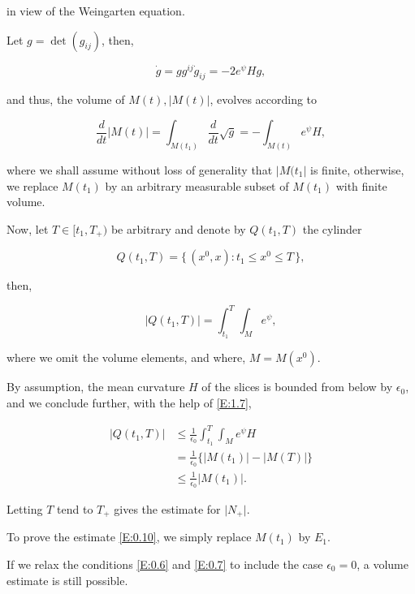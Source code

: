 \documentclass[ a4paper, oneside]{amsart}
\newcommand{\e}{\epsilon}
\newcommand{\set}[2]{\{\,#1\colon #2\,\}}
\newcommand{\abs}[1]{\lvert#1\rvert}
\newcommand\nd{\noindent}
\newcommand\cvm{\vspace\Cmedskipamount}
\newcommand\cvb{\vspace\Cbigskipamount}
\newcommand{\lae}[1]{\label{E:#1}}
\newcommand{\re}[1]{\eqref{E:#1}}
\theoremstyle{plain}
\theoremstyle{definition}
\theoremstyle{remark}
\numberwithin{equation}{section}
\begin{document}
\cvm
\nd in view of the Weingarten equation.

\cvm
Let $g=\det(g_{ij})$, then,

\begin{equation}\lae{1.6}
\dot g= g g^{ij}\dot g_{ij}=-2e^\psi H g,
\end{equation}

\cvm
\nd and thus, the volume of $M(t), \abs{M(t)}$, evolves according to

\begin{equation}\lae{1.7}
\frac d{dt}  \abs{M(t)}=\int_{M(t_1)}\frac d{dt}\sqrt g=-\int_{M(t)}e^\psi H,
\end{equation}

\cvm
\nd where we shall assume without loss of generality that $\abs{M(t_1}$ is finite,
otherwise, we replace $M(t_1)$ by an arbitrary measurable subset of $M(t_1)$
with finite volume.

\cvm
Now, let $T\in [t_1, T_+)$ be arbitrary and denote by $Q(t_1,T)$ the
cylinder

\begin{equation}\lae{1.8}
Q(t_1,T)=\set{(x^0,x)}{t_1\le x^0\le T},
\end{equation}

\cvm
\nd then,

\begin{equation}\lae{1.9}
\abs{Q(t_1,T)}=\int_{t_1}^T\int_Me^\psi,
\end{equation}

\cvm
\nd where we omit the volume elements, and where, $M=M(x^0)$.

\cvm
By assumption, the mean curvature $H$ of the slices is bounded from below by
$\e_0$, and we conclude further, with the help of \re{1.7},

\begin{equation}
\begin{aligned}
\abs{Q(t_1,T)}&\le\frac 1{\e_0} \int_{t_1}^T\int_Me^\psi H\\
&=\frac1{\e_0}\{\abs{M(t_1)}-\abs{M(T)}\}\\
&\le \frac1{\e_0}\abs{M(t_1)}.
\end{aligned}
\end{equation}


\cvm
Letting $T$ tend to $T_+$ gives the estimate for $\abs {N_+}$.

\cvm
To prove the estimate \re{0.10}, we simply replace $M(t_1)$ by $E_1$.

\cvb
If we relax the conditions \re{0.6} and \re{0.7} to include the case $\e_0=0$, a
volume estimate is still possible.
\end{document}
